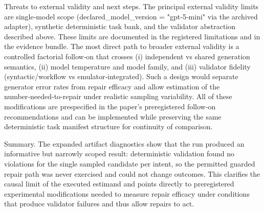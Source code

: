 \documentclass[conference]{IEEEtran}
\begin{document}
Threats to external validity and next steps. The principal external validity limits are single‑model scope (declared\_model\_version = "gpt‑5‑mini" via the archived adapter), synthetic deterministic task bank, and the validator abstraction described above. These limits are documented in the registered limitations and in the evidence bundle. The most direct path to broader external validity is a controlled factorial follow‑on that crosses (i) independent vs shared generation semantics, (ii) model temperature and model family, and (iii) validator fidelity (syntactic/workflow vs emulator‑integrated). Such a design would separate generator error rates from repair efficacy and allow estimation of the number‑needed‑to‑repair under realistic sampling variability. All of these modifications are prespecified in the paper's preregistered follow‑on recommendations and can be implemented while preserving the same deterministic task manifest structure for continuity of comparison.

Summary. The expanded artifact diagnostics show that the run produced an informative but narrowly scoped result: deterministic validation found no violations for the single sampled candidate per intent, so the permitted guarded repair path was never exercised and could not change outcomes. This clarifies the causal limit of the executed estimand and points directly to preregistered experimental modifications needed to measure repair efficacy under conditions that produce validator failures and thus allow repairs to act.
\end{document}
